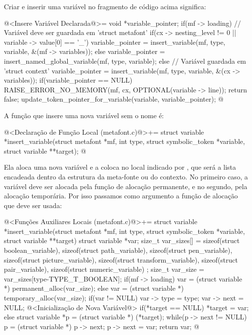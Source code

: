Criar e inserir uma variável no fragmento de código acima significa:

\iniciocodigo
@<Insere Variável Declarada@>=
{
  void *variable_pointer;
  if(mf -> loading){ // Variável deve ser guardada em 'struct metafont'
    if(cx -> nesting_level != 0 || variable -> value[0] == '_')
      variable_pointer = insert_variable(mf, type, variable,
                                         &(mf -> variables));
    else
      variable_pointer = insert_named_global_variable(mf, type, variable);
  }
  else{ // Variável guardada em 'struct context'
    variable_pointer = insert_variable(mf, type, variable, &(cx -> variables));
  }
  if(variable_pointer == NULL){
    RAISE_ERROR_NO_MEMORY(mf, cx, OPTIONAL(variable -> line));
    return false;
  }
  update_token_pointer_for_variable(variable, variable_pointer);
}
@
\fimcodigo

A função que insere uma nova variável sem o nome é:

\iniciocodigo
@<Declaração de Função Local (metafont.c)@>+=
struct variable *insert_variable(struct metafont *mf,
                                 int type,
                                 struct symbolic_token *variable,
                                 struct variable **target);
@
\fimcodigo

Ela aloca uma nova variável e a coloca no local indicado
por , que será a lista
encadeada  dentro da estrutura da meta-fonte ou
do contexto. No primeiro caso, a variável deve ser alocada pela função
de alocação permanente, e no segundo, pela alocação temporária. Por
isso passamos como argumento a função de alocação que deve ser usada:

\iniciocodigo
@<Funções Auxiliares Locais (metafont.c)@>+=
struct variable *insert_variable(struct metafont *mf,
                                 int type,
                                 struct symbolic_token *variable,
                                 struct variable **target){
  struct variable *var;
  size_t var_sizes[] = {
    sizeof(struct boolean_variable), sizeof(struct path_variable),
    sizeof(struct pen_variable), sizeof(struct picture_variable),
    sizeof(struct transform_variable), sizeof(struct pair_variable),
    sizeof(struct numeric_variable)
  };
  size_t var_size = var_sizes[type-TYPE_T_BOOLEAN];
  if(mf -> loading)
    var = (struct variable *) permanent_alloc(var_size);
  else
    var = (struct variable *) temporary_alloc(var_size);
  if(var != NULL){
    var -> type = type;
    var -> next = NULL;
    @<Inicialização de Nova Variável@>
  }  
  if(*target == NULL)
    *target = var;
  else{
    struct variable *p = (struct variable *) (*target);
    while(p -> next != NULL){
      p = (struct variable *) p -> next;
    }
    p -> next = var;
  }
  return var;
}
@
\fimcodigo

